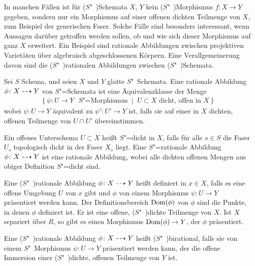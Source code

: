 In manchen Fällen ist für ($S$"~)Schemata $X$, $Y$ kein
($S$"~)Morphismus $f\colon X\to Y$ gegeben, sondern nur ein Morphismus
auf einer offenen dichten Teilmenge von $X$, zum Beispiel der
generischen Faser. Solche Fälle sind besonders interessant, wenn Aussagen
darüber getroffen werden sollen, ob und wie sich dieser Morphismus auf
ganz $X$ erweitert. Ein Beispiel sind rationale Abbildungen zwischen
projektiven Varietäten über algebraisch abgeschlossenen Körpern.
Eine Verallgemeinerung davon sind die ($S$"~)rationalen Abbildungen
zwischen ($S$"~)Schemata.
\begin{Definition}\label{def:ratabb}
  Sei $S$ Schema, und seien $X$ und $Y$ glatte $S$"~Sche\-ma\-ta.
  Eine rationale Abbildung $\phi\colon X\dashrightarrow Y$ von
  $S$"=Schemata ist eine Äquivalenzklasse der Menge
  \begin{gather*}
    \left\{
      \psi\colon U\to Y \text{ $S$"=Morphismus}
      \;\middle|\;
      U\subset X \text{ dicht, offen in $X$}
    \right\}
  \end{gather*}
  wobei $\psi\colon U\to Y$ äquivalent zu $\psi'\colon U'\to Y$ ist,
  falls sie auf einer in $X$ dichten, offenen Teilmenge von $U\cap U'$
  übereinstimmen.
  
  Ein offenes Unterschema $U\subset X$ heißt $S$"=dicht in $X$,
  falls für alle $s\in S$ die Faser $U_s$ %
  topologisch dicht in der Faser $X_s$ %
  liegt.
  Eine $S$"=rationale Abbildung $\phi\colon X\dashrightarrow Y$ ist eine
  rationale Abbildung, wobei alle dichten offenen Mengen aus obiger
  Definition $S$"=dicht sind.

  Eine ($S$"~)rationale Abbildung $\phi\colon X\dashrightarrow Y$ heißt definiert
  in $x\in X$, falls es eine offene Umgebung $U$ von $x$ gibt und
  $\phi$ von einem Morphismus $\psi\colon U\to Y$ präsentiert werden
  kann.
  Der Definitionsbereich $\operatorname{Dom}(\phi)$ von $\phi$ sind die
  Punkte, in denen $\phi$ definiert ist. Er ist eine offene,
  ($S$"~)dichte Teilmenge von $X$. Ist $X$ separiert über $R$, so gibt
  es einen Morphismus $\operatorname{Dom}(\phi)\to Y$, der $\phi$ präsentiert.
  
  Eine ($S$"~)rationale Abbildung $\phi\colon X\dashrightarrow Y$ heißt
  ($S$"~)birational, falls sie von einem $S$"~Mor\-phis\-mus
  ${\psi\colon U\to Y}$ präsentiert werden kann, der die offene
  Immersion einer ($S$"~)dich\-te, offenen Teilmenge von $Y$ ist.
\end{Definition}


